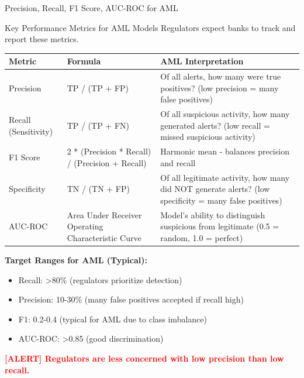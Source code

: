 \documentclass[11pt,a4paper]{beamer}
\newcommand{\redflag}[1]{\textcolor{red}{\textbf{[ALERT] #1}}}
\begin{document}
\begin{frame}{Precision, Recall, F1 Score, AUC-ROC for AML}
	\begin{block}{Key Performance Metrics for AML Models}
		Regulators expect banks to track and report these metrics.
	\end{block}
	\begin{tabular}{p{}|p{}|p{}}
		\hline
		\rowcolor{lightgray}
		\textbf{Metric} & \textbf{Formula} & \textbf{AML Interpretation} \\
		\hline
		Precision & TP / (TP + FP) & Of all alerts, how many were true positives? (low precision = many false positives) \\
		\hline
		Recall (Sensitivity) & TP / (TP + FN) & Of all suspicious activity, how many generated alerts? (low recall = missed suspicious activity) \\
		\hline
		F1 Score & 2 * (Precision * Recall) / (Precision + Recall) & Harmonic mean - balances precision and recall \\
		\hline
		Specificity & TN / (TN + FP) & Of all legitimate activity, how many did NOT generate alerts? (low specificity = many false positives) \\
		\hline
		AUC-ROC & Area Under Receiver Operating Characteristic Curve & Model's ability to distinguish suspicious from legitimate (0.5 = random, 1.0 = perfect) \\
		\hline
	\end{tabular}
	\textbf{Target Ranges for AML (Typical):}
	\begin{itemize}
		\item Recall: >80\% (regulators prioritize detection)
		\item Precision: 10-30\% (many false positives accepted if recall high)
		\item F1: 0.2-0.4 (typical for AML due to class imbalance)
		\item AUC-ROC: >0.85 (good discrimination)
	\end{itemize}
	\redflag{Regulators are less concerned with low precision than low recall.}
\end{frame}

\end{document}
